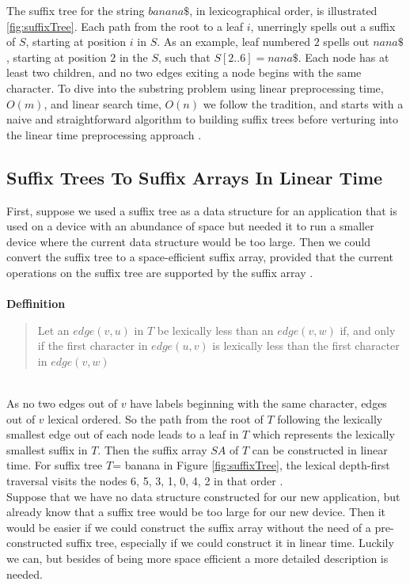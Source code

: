 \documentclass[12pt]{article} %
\begin{document}
The suffix tree for the string $banana\$$, in lexicographical order, is illustrated \ref{fig:suffixTree}. Each path from the root to a leaf $i$, unerringly spells out a suffix of $S$, starting at position $i$ in $S$. As an example, leaf numbered $2$ spells out $nana\$$, starting at position $2$ in the $S$, such that $S[2..6] = nana\$$. Each node has at least two children, and no two edges exiting a node begins with the same character. 
\newline
To dive into the substring problem using linear preprocessing time, $O(m)$, and linear search time, $O(n)$ we follow the tradition, and starts with a naive and straightforward algorithm to building suffix trees before verturing into the linear time preprocessing approach \cite{gusfield}. 



\subsection{Suffix Trees To Suffix Arrays In Linear Time}

First, suppose we used a suffix tree as a data structure for an application that is used on a device with an abundance of space but needed it to run a smaller device where the current data structure would be too large. Then we could convert the suffix tree to a space-efficient suffix array, provided that the current operations on the suffix tree are supported by the suffix array \cite{gusfield}. 
\\ \\
\textbf{Deffinition}
\begin{quote}
 Let an $edge(v, u)$ in $T$ be lexically less than an $edge(v, w)$ if, and only if the first character in $edge(u, v)$ is lexically less than the first character in $edge(v, w)$ \cite{gusfield}
\end{quote}
\\
As no two edges out of $v$ have labels beginning with the same character, edges out of $v$ lexical ordered. So the path from the root of $T$ following the lexically smallest edge out of each node leads to a leaf in $T$ which represents the lexically smallest suffix in $T$. Then the suffix array $SA$ of $T$ can be constructed in linear time.
For suffix tree $T$= banana in Figure \ref{fig:suffixTree}, the lexical depth-first traversal visits the nodes 6, 5, 3, 1, 0, 4, 2 in that order \cite{gusfield}. 
\\
Suppose that we have no data structure constructed for our new application, but already know that a suffix tree would be too large for our new device. Then it would be easier if we could construct the suffix array without the need of a pre-constructed suffix tree, especially if we could construct it in linear time. Luckily we can, but besides of being more space efficient a more detailed description is needed.
\end{document}
